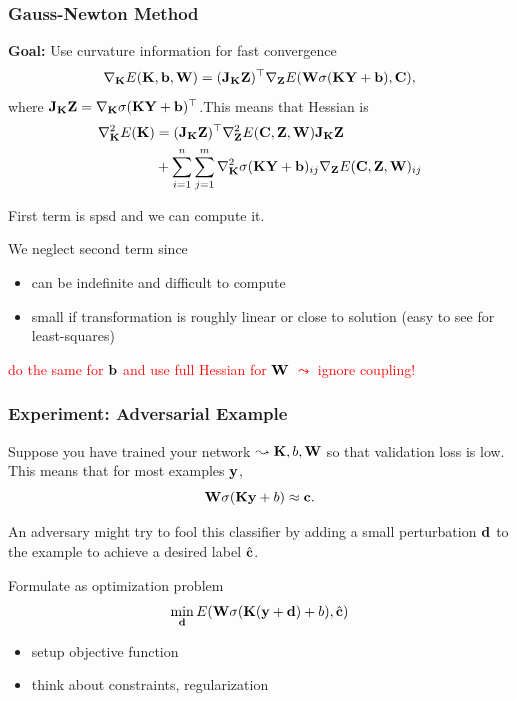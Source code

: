 \documentclass[12pt,fleqn,handout]{beamer}
\begin{document}
\begin{frame}
	\frametitle{Gauss-Newton Method}
	
	\textbf{Goal:} Use curvature information for fast convergence
	$$
	\nabla_{{\bf K}} E({\bf K},{\bf b},{\bf W}) =  ({\bf J}_{\bf K} {\bf Z})^\top \nabla_{\bf Z} E({\bf W}\sigma({\bf K} {\bf Y}+{\bf b}),{\bf C}),
	$$
	where ${\bf J}_{\bf K} {\bf Z} = \nabla_{{\bf K}} \sigma({\bf K} {\bf Y}+{\bf b})^\top$.\pause This means that Hessian is
	\begin{equation*}
		\begin{split}
	\nabla_{{\bf K}}^2 E({\bf K}) &  = ({\bf J}_{{\bf K}}{\bf Z})^\top  \nabla_{\bf Z}^2 E({\bf C},{\bf Z},{\bf W}) {\bf J}_{{\bf K}}{\bf Z}\\
	 & + \sum_{i=1}^{n}\sum_{j=1}^{m} \nabla_{{\bf K}}^2 \sigma({\bf K} {\bf Y}+{\bf b})_{ij} \nabla_{\bf Z} E({\bf C},{\bf Z},{\bf W})_{ij}
		\end{split}
	\end{equation*}
	
	First term is spsd and we can compute it.
	
	\pause
	
	We neglect second term since
	\begin{itemize}
		\item can be indefinite and difficult to compute
		\item small if transformation is roughly linear or close to solution (easy to see for least-squares)
	\end{itemize}
	\begin{center}
		\textcolor{red}{do the same for ${\bf b}$ and use full Hessian for ${\bf W}$ $\leadsto$ ignore coupling!}
	\end{center}	
\end{frame}

\begin{frame}[fragile]
	\frametitle{Experiment: Adversarial Example}
	
	Suppose you have trained your network $\leadsto {\bf K}, b, {\bf W}$ so that validation loss is low. This means that for most examples ${\bf y}$, 
	$$
		{\bf W} \sigma({\bf K} {\bf y} + b) \approx {\bf c}.
	$$
	
	An adversary might try to fool this classifier by adding a small perturbation ${\bf d}$ to the example to achieve a desired label $\hat{{\bf c}}$. 
	
	\bigskip
	
	Formulate as optimization problem
	$$
		\min_{{\bf d}} E({\bf W} \sigma({\bf K} ({\bf y} + {\bf d}) + b), \hat{{\bf c}})
	$$
	\begin{itemize}
		\item setup objective function
		\item think about constraints, regularization
	\end{itemize}
\end{frame}
\end{document}
